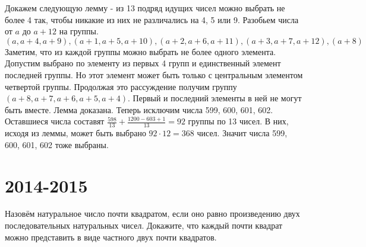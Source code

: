 \documentclass[11pt, a4paper]{template}
\begin{document}
\begin{solution}
Докажем следующую лемму - из 13 подряд идущих чисел можно выбрать не более 4 так, чтобы никакие из них не различались на 4, 5 или 9. Разобьем числа от $a$ до $a + 12$ на группы.
$$
(a, a + 4, a + 9), (a + 1, a + 5, a + 10), (a + 2, a + 6, a + 11), (a + 3, a + 7, a + 12), (a + 8) 
$$
Заметим, что из каждой группы можно выбрать не более одного элемента. Допустим выбрано по элементу из первых 4 групп и единственный элемент последней группы. Но  этот элемент может быть только с центральным элементом четвертой группы. Продолжая это рассуждение получим группу $(a + 8, a + 7, a + 6, a + 5, a + 4)$. Первый и последний элементы в ней не могут быть вместе. Лемма доказана. Теперь исключим числа 599, 600, 601, 602. Оставшиеся числа составят $\frac{598}{13} + \frac{1200 - 603 + 1}{13} = 92$ группы по 13 чисел.  В них, исходя из леммы, может быть выбрано $92 \cdot 12 = 368$ чисел. Значит числа 599, 600, 601, 602 тоже выбраны. 
\end{solution}

\chapter{2014-2015}

\begin{exercise}
Назовём натуральное число почти квадратом, если оно равно произведению двух последовательных натуральных чисел. Докажите, что каждый почти квадрат можно представить в виде частного двух почти квадратов.
\end{exercise}
\end{document}
